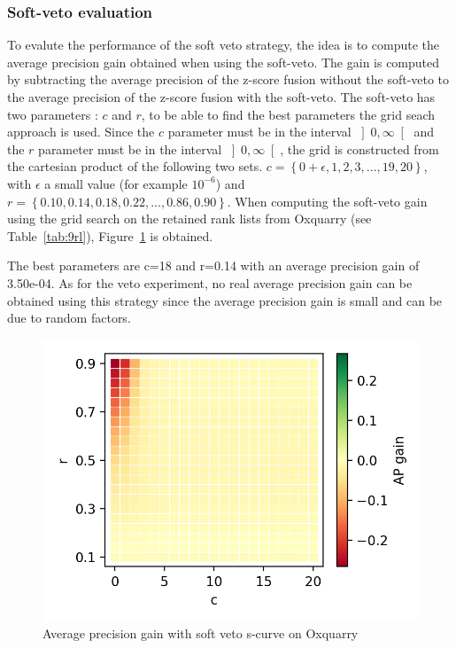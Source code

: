\subsubsection{Soft-veto evaluation}

To evalute the performance of the soft veto strategy, the idea is to compute the average precision gain obtained when using the soft-veto.
The gain is computed by subtracting the average precision of the z-score fusion without the soft-veto to the average precision of the z-score fusion with the soft-veto.
The soft-veto has two parameters : $c$ and $r$, to be able to find the best parameters the grid seach approach is used.
Since the $c$ parameter must be in the interval $\left]0, \infty\right[$ and the $r$ parameter must be in the interval $\left]0, \infty\right[$, the grid is constructed from the cartesian product of the following two sets.
$c = \left\{0 + \epsilon, 1, 2, 3, ..., 19, 20\right\}$, with $\epsilon$ a small value (for example $10^{-6}$) and $r = \left\{0.10, 0.14, 0.18, 0.22, ..., 0.86, 0.90\right\}$.
When computing the soft-veto gain using the grid search on the retained rank lists from Oxquarry (see Table~\ref{tab:9rl}), Figure~\ref{fig:soft_veto} is obtained.

The best parameters are c=18 and r=0.14 with an average precision gain of 3.50e-04.
As for the veto experiment, no real average precision gain can be obtained using this strategy since the average precision gain is small and can be due to random factors.

\begin{figure}
  \caption{Average precision gain with soft veto s-curve on Oxquarry}
  \label{fig:soft_veto}
  \includegraphics[width=\linewidth]{img/soft_veto.png}
\end{figure}

